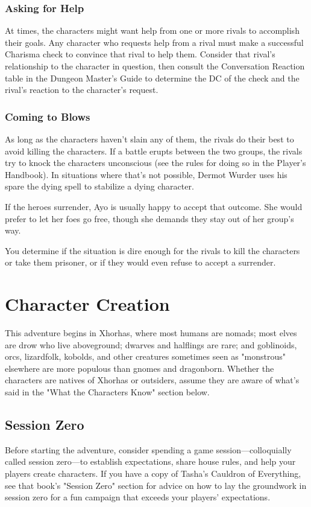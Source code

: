 \documentclass[10pt,a4paper,twoside,bg=print,twocolumn,openany,nodeprecatedcode]{dndbook}
\begin{document}
\subsubsection{Asking for Help}
At times, the characters might want help from one or more rivals to accomplish their goals. Any character who requests help from a rival must make a successful Charisma check to convince that rival to help them. Consider that rival's relationship to the character in question, then consult the Conversation Reaction table in the Dungeon Master's Guide to determine the DC of the check and the rival's reaction to the character's request.

\subsubsection{Coming to Blows}
As long as the characters haven't slain any of them, the rivals do their best to avoid killing the characters. If a battle erupts between the two groups, the rivals try to knock the characters unconscious (see the rules for doing so in the Player's Handbook). In situations where that's not possible, Dermot Wurder uses his spare the dying spell to stabilize a dying character.

If the heroes surrender, Ayo is usually happy to accept that outcome. She would prefer to let her foes go free, though she demands they stay out of her group's way.

You determine if the situation is dire enough for the rivals to kill the characters or take them prisoner, or if they would even refuse to accept a surrender.


\section{Character Creation}
This adventure begins in Xhorhas, where most humans are nomads; most elves are drow who live aboveground; dwarves and halflings are rare; and goblinoids, orcs, lizardfolk, kobolds, and other creatures sometimes seen as "monstrous" elsewhere are more populous than gnomes and dragonborn. Whether the characters are natives of Xhorhas or outsiders, assume they are aware of what's said in the "What the Characters Know" section below.

\subsection{Session Zero}
Before starting the adventure, consider spending a game session—colloquially called session zero—to establish expectations, share house rules, and help your players create characters. If you have a copy of Tasha's Cauldron of Everything, see that book's "Session Zero" section for advice on how to lay the groundwork in session zero for a fun campaign that exceeds your players' expectations.
\end{document}
